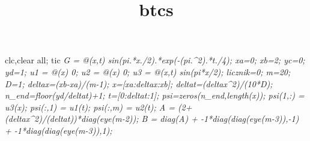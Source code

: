 \documentclass[]{article}
\title{btcs}
\author{}
\date{}
\newenvironment{Shaded}{\begin{snugshade}}{\end{snugshade}}
\newcommand{\BaseNTok}[1]{\textcolor[rgb]{0.00,0.00,0.81}{#1}}
\newcommand{\FloatTok}[1]{\textcolor[rgb]{0.00,0.00,0.81}{#1}}
\newcommand{\CommentTok}[1]{\textcolor[rgb]{0.56,0.35,0.01}{\textit{#1}}}
\newcommand{\FunctionTok}[1]{\textcolor[rgb]{0.00,0.00,0.00}{#1}}
\newcommand{\NormalTok}[1]{#1}
\begin{document}
\maketitle

\begin{Shaded}
\begin{Highlighting}[]
\FunctionTok{clc}\NormalTok{,}\FunctionTok{clear} \FunctionTok{all}\NormalTok{; }\FunctionTok{tic}
\CommentTok{%rozwiązanie analityczne}
\NormalTok{G = @(x,t) }\FunctionTok{sin}\NormalTok{(}\BaseNTok{pi}\NormalTok{.*x./}\FloatTok{2}\NormalTok{).*}\FunctionTok{exp}\NormalTok{(-(}\BaseNTok{pi}\NormalTok{.^}\FloatTok{2}\NormalTok{).*t./}\FloatTok{4}\NormalTok{);}
\CommentTok{%przedział omega}
\NormalTok{xa=}\FloatTok{0}\NormalTok{; xb=}\FloatTok{2}\NormalTok{; yc=}\FloatTok{0}\NormalTok{; yd=}\FloatTok{1}\NormalTok{;}
\CommentTok{%warunki brzegowe}
\NormalTok{u1 = @(x) }\FloatTok{0}\NormalTok{;}
\NormalTok{u2 = @(x) }\FloatTok{0}\NormalTok{;}
\NormalTok{u3 = @(x,t) }\FunctionTok{sin}\NormalTok{(}\BaseNTok{pi}\NormalTok{*x/}\FloatTok{2}\NormalTok{);}
\NormalTok{licznik=}\FloatTok{0}\NormalTok{;}
\CommentTok{%siatka}
\NormalTok{m=}\FloatTok{20}\NormalTok{; D=}\FloatTok{1}\NormalTok{;}
\NormalTok{deltax=(xb-xa)/(m-}\FloatTok{1}\NormalTok{);}
\NormalTok{x=[xa:deltax:xb];         }\CommentTok{%przedział przestrzenny}
\NormalTok{deltat=(deltax^}\FloatTok{2}\NormalTok{)/(}\FloatTok{10}\NormalTok{*D); }
\NormalTok{n_end=}\FunctionTok{floor}\NormalTok{(yd/deltat)+}\FloatTok{1}\NormalTok{; }
\NormalTok{t=[}\FloatTok{0}\NormalTok{:deltat:}\FloatTok{1}\NormalTok{];           }\CommentTok{%przedział czasowy}
\CommentTok{%macierz}
\FunctionTok{psi}\NormalTok{=}\FunctionTok{zeros}\NormalTok{(n_end,}\FunctionTok{length}\NormalTok{(x)); }\CommentTok{%utworzenie pustej macierzy}
\CommentTok{%dodanie warunku początkowego}
\FunctionTok{psi}\NormalTok{(}\FloatTok{1}\NormalTok{,:) = u3(x);}
\FunctionTok{psi}\NormalTok{(:,}\FloatTok{1}\NormalTok{) = u1(t);}
\FunctionTok{psi}\NormalTok{(:,m) = u2(t);}
\NormalTok{A = (}\FloatTok{2}\NormalTok{+(deltax^}\FloatTok{2}\NormalTok{)/(deltat))*}\FunctionTok{diag}\NormalTok{(}\FunctionTok{eye}\NormalTok{(m-}\FloatTok{2}\NormalTok{));}
\NormalTok{B = }\FunctionTok{diag}\NormalTok{(A) + -}\FloatTok{1}\NormalTok{*}\FunctionTok{diag}\NormalTok{(}\FunctionTok{diag}\NormalTok{(}\FunctionTok{eye}\NormalTok{(m-}\FloatTok{3}\NormalTok{)),-}\FloatTok{1}\NormalTok{) + -}\FloatTok{1}\NormalTok{*}\FunctionTok{diag}\NormalTok{(}\FunctionTok{diag}\NormalTok{(}\FunctionTok{eye}\NormalTok{(m-}\FloatTok{3}\NormalTok{)),}\FloatTok{1}\NormalTok{);}
}}}}}}}}}
\end{Highlighting}
\end{Shaded}
\end{document}
